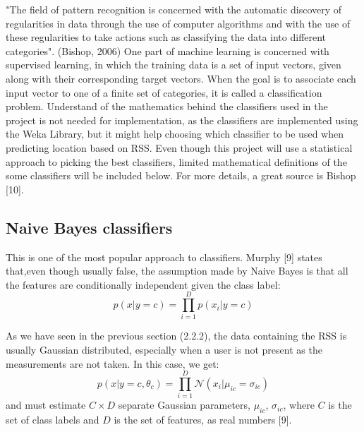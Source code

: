 "The field of pattern recognition is concerned with the automatic discovery of regularities in data through the use of computer algorithms and with the use of these regularities to take actions such as classifying the data into different categories". (Bishop, 2006)
One part of machine learning is concerned with supervised learning, in which the training data is a set of input vectors, given along with their corresponding target vectors. When the goal is to associate each input vector to one of a finite set of categories, it is called a classification problem. Understand of the mathematics behind the classifiers used in the project is not needed for implementation, as the classifiers are implemented using the Weka Library, but it might help choosing which classifier to be used when predicting location based on RSS. Even though this project will use a statistical approach to picking the best classifiers, limited mathematical definitions of the some classifiers will be included below. For more details, a great source is Bishop [10].

\subsection{Naive Bayes classifiers}
This is one of the most popular approach to classifiers. Murphy [9] states that,even though usually false, the assumption made by Naive Bayes is that all the features are conditionally independent given the class label:
$$ p(x|y = c) = \prod\limits_{i=1}^D p(x_i|y = c) $$

As we have seen in the previous section (2.2.2), the data containing the RSS is usually Gaussian distributed, especially when a user is not present as the measurements are not taken. In this case, we get:
$$ p(x|y = c,\theta_c) = \prod\limits_{i=1}^D \mathcal{N}(x_i|\mu_{ic} = \sigma_{ic}) $$ and must estimate $C \times D$ separate Gaussian parameters, $\mu_{ic}$, $\sigma_{ic}$, where $C$ is the set of class labels and $D$ is the set of features, as real numbers [9].

